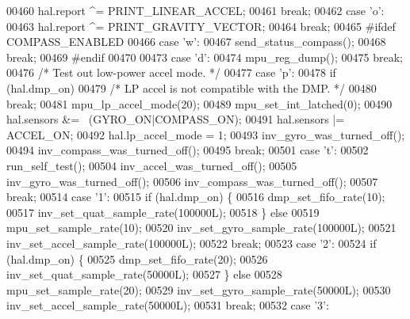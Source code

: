 \begin{DoxyCode}
00460         hal.report ^= PRINT_LINEAR_ACCEL;
00461         \textcolor{keywordflow}{break};
00462     \textcolor{keywordflow}{case} \textcolor{charliteral}{'o'}:
00463         hal.report ^= PRINT_GRAVITY_VECTOR;
00464         \textcolor{keywordflow}{break};
00465 \textcolor{preprocessor}{#ifdef COMPASS\_ENABLED}
00466     \textcolor{keywordflow}{case} \textcolor{charliteral}{'w'}:
00467         send\_status\_compass();
00468         \textcolor{keywordflow}{break};
00469 \textcolor{preprocessor}{#endif}
00470 
00473     \textcolor{keywordflow}{case} \textcolor{charliteral}{'d'}:
00474         mpu\_reg\_dump();
00475         \textcolor{keywordflow}{break};
00476     \textcolor{comment}{/* Test out low-power accel mode. */}
00477     \textcolor{keywordflow}{case} \textcolor{charliteral}{'p'}:
00478         \textcolor{keywordflow}{if} (hal.dmp_on)
00479             \textcolor{comment}{/* LP accel is not compatible with the DMP. */}
00480             \textcolor{keywordflow}{break};
00481         mpu\_lp\_accel\_mode(20);
00489         mpu\_set\_int\_latched(0);
00490         hal.sensors &= ~(GYRO_ON|COMPASS_ON);
00491         hal.sensors |= ACCEL_ON;
00492         hal.lp_accel_mode = 1;
00493         inv\_gyro\_was\_turned\_off();
00494         inv\_compass\_was\_turned\_off();
00495         \textcolor{keywordflow}{break};
00501     \textcolor{keywordflow}{case} \textcolor{charliteral}{'t'}:
00502         run_self_test();
00504         inv\_accel\_was\_turned\_off();
00505         inv\_gyro\_was\_turned\_off();
00506         inv\_compass\_was\_turned\_off();
00507         \textcolor{keywordflow}{break};
00514     \textcolor{keywordflow}{case} \textcolor{charliteral}{'1'}:
00515         \textcolor{keywordflow}{if} (hal.dmp_on) \{
00516             dmp\_set\_fifo\_rate(10);
00517             inv\_set\_quat\_sample\_rate(100000L);
00518         \} \textcolor{keywordflow}{else}
00519             mpu\_set\_sample\_rate(10);
00520         inv\_set\_gyro\_sample\_rate(100000L);
00521         inv\_set\_accel\_sample\_rate(100000L);
00522         \textcolor{keywordflow}{break};
00523     \textcolor{keywordflow}{case} \textcolor{charliteral}{'2'}:
00524         \textcolor{keywordflow}{if} (hal.dmp_on) \{
00525             dmp\_set\_fifo\_rate(20);
00526             inv\_set\_quat\_sample\_rate(50000L);
00527         \} \textcolor{keywordflow}{else}
00528             mpu\_set\_sample\_rate(20);
00529         inv\_set\_gyro\_sample\_rate(50000L);
00530         inv\_set\_accel\_sample\_rate(50000L);
00531         \textcolor{keywordflow}{break};
00532     \textcolor{keywordflow}{case} \textcolor{charliteral}{'3'}:

\end{DoxyCode}
